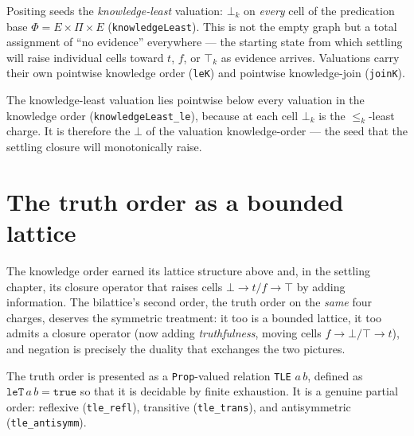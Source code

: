 \begin{definition}\label{def:knowledge-least}\leanok{}
  Positing seeds the \emph{knowledge-least} valuation: $\bot_k$ on \emph{every} cell of the predication base $\Phi = E \times \Pi \times E$ (\texttt{knowledgeLeast}). This is not the empty graph but a total assignment of ``no evidence'' everywhere --- the starting state from which settling will raise individual cells toward $t$, $f$, or $\top_k$ as evidence arrives. Valuations carry their own pointwise knowledge order (\texttt{leK}) and pointwise knowledge-join (\texttt{joinK}).
\end{definition}

\begin{theorem}\label{thm:knowledgeLeast-le}\leanok{}
  The knowledge-least valuation lies pointwise below every valuation in the knowledge order (\texttt{knowledgeLeast\_le}), because at each cell $\bot_k$ is the $\le_k$-least charge. It is therefore the $\bot$ of the valuation knowledge-order --- the seed that the settling closure will monotonically raise.
\end{theorem}

\section{The truth order as a bounded lattice}

The knowledge order earned its lattice structure above and, in the settling chapter, its closure operator that raises cells $\bot \to t/f \to \top$ by adding information. The bilattice's second order, the truth order on the \emph{same} four charges, deserves the symmetric treatment: it too is a bounded lattice, it too admits a closure operator (now adding \emph{truthfulness}, moving cells $f \to \bot/\top \to t$), and negation is precisely the duality that exchanges the two pictures.

\begin{definition}\label{def:tle}\leanok{}
  The truth order is presented as a \texttt{Prop}-valued relation \texttt{TLE} $a\,b$, defined as $\texttt{leT}\,a\,b = \texttt{true}$ so that it is decidable by finite exhaustion. It is a genuine partial order: reflexive (\texttt{tle\_refl}), transitive (\texttt{tle\_trans}), and antisymmetric (\texttt{tle\_antisymm}).
\end{definition}

